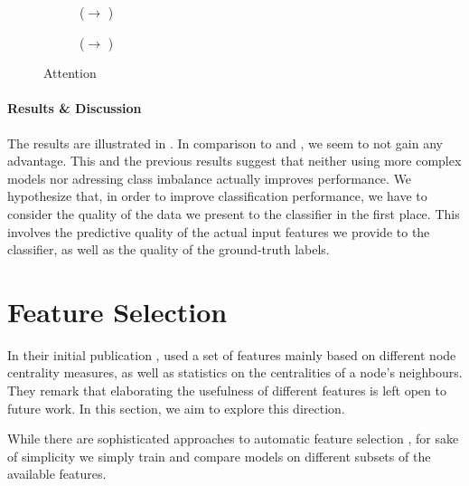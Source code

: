 \documentclass[
	fontsize=10pt, %
	twoside=false, %
	secnumdepth=1, %
  toc=indentunnumbered %
]{kaobook}
\begin{document}
\begin{figure}[h]
\centering
\begin{subfigure}[h]{0.48\linewidth}
  \caption{(\ADLast $\rightarrow$ \PDMap)}
\end{subfigure}
\begin{subfigure}[h]{0.48\linewidth}
  \caption{(\ADLast $\rightarrow$ \ReconMap{})}
\end{subfigure}
\caption{Attention}
\label{fig:results-attention}
\end{figure}

\paragraph{Results \& Discussion} The results are illustrated in
. In comparison to 
and , we seem to not gain any advantage.
%
This and the previous results suggest that neither using more complex models nor
adressing class imbalance actually improves performance. We hypothesize that, in
order to improve classification performance, we have to consider the quality of
the data we present to the classifier in the first place. This involves the
predictive quality of the actual input features we provide to the classifier, as
well as the quality of the ground-truth labels.





\section{Feature Selection}
\label{sec:feature-selection}


In their initial publication \cite{nielsen_MachineLearningSupport_2019},
\nielsen{} used a set of features mainly based on different node centrality
measures, as well as statistics on the centralities of a node's neighbours. They
remark that elaborating the usefulness of different features is left open to
future work. In this section, we aim to explore this direction.

While there are sophisticated approaches to automatic feature selection  
\cite{saeys_ReviewFeatureSelection_2007},
for sake of simplicity we simply train and compare models on different subsets
of the available features.
\end{document}
